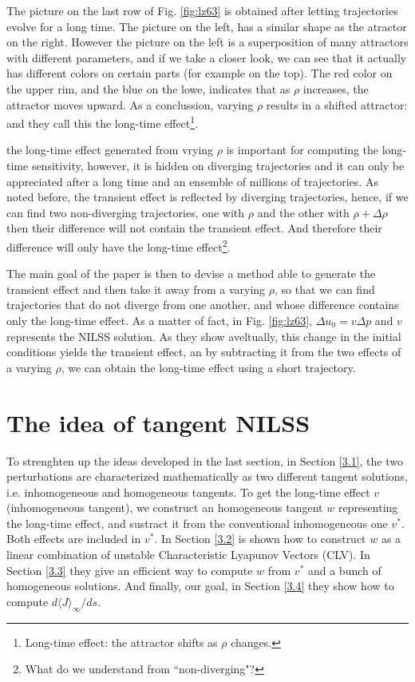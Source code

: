 \documentclass[10pt,twoside,a4paper]{article} %
\begin{document}
The picture on the last row of Fig. \ref{fig:lz63} is obtained after letting trajectories evolve for a long time. The picture on the left, has a similar shape as the atractor on the right. However the picture on the left is a superposition of many attractors with different parameters, and if we take a closer look, we can see that it actually has different colors on certain parts (for example on the top). The red color on the upper rim, and the blue on the lowe, indicates that as $\rho$ increases, the attractor moves upward. As a conclussion, varying $\rho$ results in a shifted attractor: and they call this the long-time effect\footnote{Long-time effect: the attractor shifts as $\rho$ changes.}.

the long-time effect generated from vrying $\rho$ is important for computing the long-time sensitivity, however, it is hidden on diverging trajectories and it can only be appreciated after a long time and an ensemble of millions of trajectories. As noted before, the transient effect is reflected by diverging trajectories, hence, if we can find two non-diverging trajectories, one with $\rho$ and the other with $\rho+\Delta \rho$ then their difference will not contain the transient effect. And therefore their difference will only have the long-time effect\footnote{What do we understand from ``non-diverging"?}.

The main goal of the paper is then to devise a method able to generate the transient effect and then take it away from a varying $\rho$, so that we can find trajectories that do not diverge from one another, and whose difference contains only the long-time effect. As a matter of fact, in Fig. \ref{fig:lz63}, $\Delta u_0 = v\Delta p$ and $v$ represents the NILSS solution. As they show aveltually, this change in the initial conditions yields the transient effect, an by subtracting it from the two effects of a varying $\rho$, we can obtain the long-time effect using a short trajectory.

\section{The idea of tangent NILSS}

To strenghten up the ideas developed in the last section, in Section \ref{3.1}, the two perturbations are characterized mathematically as two different tangent solutions, i.e. inhomogeneous and homogeneous tangents. To get the long-time effect $v$ (inhomogeneous tangent), we construct an homogeneous tangent $w$ representing the long-time effect, and sustract it from the conventional inhomogeneous one $v^*$. Both effects are included in $v^*$. In Section \ref{3.2} is shown how to construct $w$ as a linear combination of unstable Characteristic Lyapunov Vectors (CLV). In Section \ref{3.3} they give an efficient way to compute $w$ from $v^*$ and a bunch of homogeneous solutions. And finally, our goal, in Section \ref{3.4} they show how to compute $d\langle J \rangle_\infty /ds$.
\end{document}
